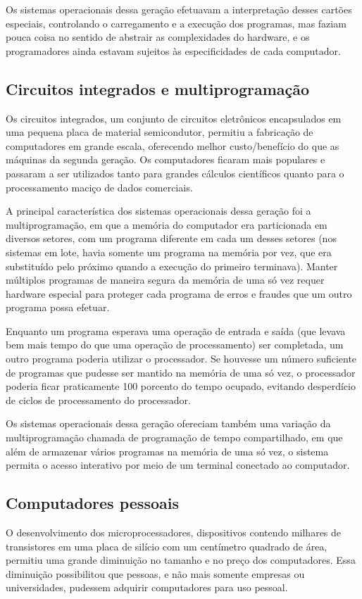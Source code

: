 \documentclass[11pt,twoside,a4paper]{book}
\begin{document}
Os sistemas operacionais dessa geração efetuavam a interpretação desses cartões especiais, controlando o carregamento e a execução dos programas, mas faziam pouca coisa no sentido de abstrair as complexidades do hardware, e os programadores ainda estavam sujeitos às especificidades de cada computador.

\subsection*{Circuitos integrados e multiprogramação}
Os circuitos integrados, um conjunto de circuitos eletrônicos encapsulados em uma pequena placa de material semicondutor, permitiu a fabricação de computadores em grande escala, oferecendo melhor custo/benefício do que as máquinas da segunda geração. Os computadores ficaram mais populares e passaram a ser utilizados tanto para grandes cálculos científicos quanto para o processamento maciço de dados comerciais.

A principal característica dos sistemas operacionais dessa geração foi a multiprogramação, em que a memória do computador era particionada em diversos setores, com um programa diferente em cada um desses setores (nos sistemas em lote, havia somente um programa na memória por vez, que era substituído pelo próximo quando a execução do primeiro terminava). Manter múltiplos programas de maneira segura da memória de uma só vez requer hardware especial para proteger cada programa de erros e fraudes que um outro programa possa efetuar.

Enquanto um programa esperava uma operação de entrada e saída (que levava bem mais tempo do que uma operação de processamento) ser completada, um outro programa poderia utilizar o processador. Se houvesse um número suficiente de programas que pudesse ser mantido na memória de uma só vez, o processador poderia ficar praticamente 100 porcento do tempo ocupado, evitando desperdício de ciclos de processamento do processador.

Os sistemas operacionais dessa geração ofereciam também uma variação da multiprogramação chamada de programação de tempo compartilhado, em que além de armazenar vários programas na memória de uma só vez, o sistema permita o acesso interativo por meio de um terminal conectado ao computador.

\subsection*{Computadores pessoais}
O desenvolvimento dos microprocessadores, dispositivos contendo milhares de transistores em uma placa de silício com um centímetro quadrado de área, permitiu uma grande diminuição no tamanho e no preço dos computadores. Essa diminuição possibilitou que pessoas, e não mais somente empresas ou universidades, pudessem adquirir computadores para uso pessoal.
\end{document}
